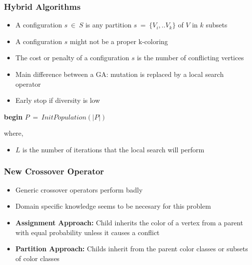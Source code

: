 \documentclass{beamer}
\begin{document}
\begin{frame}
\frametitle{Hybrid Algorithms}
\begin{multicols}{2}
\begin{itemize}
\item A configuration $s\ \in\ S$ is any partition $s\ =\ \{V_i,..V_k\}$ of $V$ in $k$ subsets
\item A configuration $s$ might not be a proper k-coloring
\item The cost or penalty of a configuration $s$ is the number of conflicting vertices
\item Main difference between a GA: mutation is replaced by a local search operator
\item Early stop if diversity is low
\end{itemize}
\columnbreak
\small{
\begin{algorithm}[H]
{\bf begin}\;
$P\ =\ InitPopulation(|P|)$\;
\end{algorithm}
}
where,
\begin{itemize}
\item $L$ is the number of iterations that the local search will perform
\end{itemize}
\end{multicols}
\end{frame}

\begin{frame}
\frametitle{New Crossover Operator}
\begin{itemize}
\item Generic crossover operators perform badly
\item Domain specific knowledge seems to be necesary for this problem
\item {\bf Assignment Approach:} Child inherits the color of a vertex from a parent with equal probability unless it causes a conflict
\item {\bf Partition Approach:} Childs inherit from the parent color classes or subsets of color classes
\end{itemize}

\end{frame}
\end{document}
